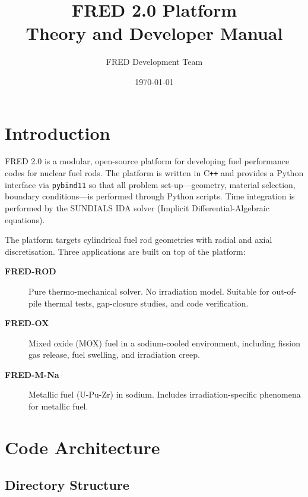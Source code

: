 \documentclass[11pt,a4paper]{article}
\title{FRED 2.0 Platform\\[6pt]
       \large Theory and Developer Manual}
\author{FRED Development Team}
\date{\today}
\begin{document}
\maketitle
\tableofcontents
\newpage

\section{Introduction}

FRED 2.0 is a modular, open-source platform for developing fuel performance
codes for nuclear fuel rods.  The platform is written in C\texttt{++} and
provides a Python interface via \texttt{pybind11} so that all problem
set-up---geometry, material selection, boundary conditions---is performed
through Python scripts.  Time integration is performed by the SUNDIALS IDA
solver (Implicit Differential-Algebraic equations).

The platform targets cylindrical fuel rod geometries with radial and axial
discretisation.  Three applications are built on top of the platform:

\begin{description}
  \item[\textbf{FRED-ROD}] Pure thermo-mechanical solver.  No irradiation
        model.  Suitable for out-of-pile thermal tests, gap-closure studies,
        and code verification.
  \item[\textbf{FRED-OX}]  Mixed oxide (MOX) fuel in a sodium-cooled
        environment, including fission gas release, fuel swelling, and
        irradiation creep.
  \item[\textbf{FRED-M-Na}]  Metallic fuel (U-Pu-Zr) in sodium.
        Includes irradiation-specific phenomena for metallic fuel.
\end{description}

\section{Code Architecture}

\subsection{Directory Structure}
\end{document}
